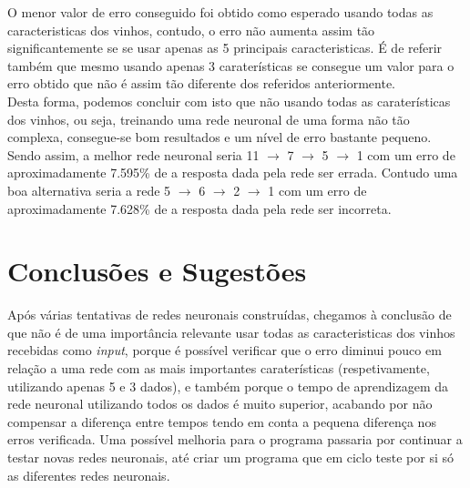 \documentclass{article}
\begin{document}
O menor valor de erro conseguido foi obtido como esperado usando todas as caracteristicas dos vinhos, contudo, o erro não aumenta assim tão significantemente se se usar apenas as 5 principais caracteristicas. É de referir também que mesmo usando apenas 3 caraterísticas se consegue um valor para o erro obtido que não é assim tão diferente dos referidos anteriormente.\\
Desta forma, podemos concluir com isto que não usando todas as caraterísticas dos vinhos, ou seja, treinando uma rede neuronal de uma forma não tão complexa, consegue-se bom resultados e um nível de erro bastante pequeno.
Sendo assim, a melhor rede neuronal seria 11 $\to$ 7 $\to$ 5 $\to$ 1 com um erro de aproximadamente 7.595\% de a resposta dada pela rede ser errada. Contudo uma boa alternativa seria a rede 5 $\to$ 6 $\to$ 2 $\to$ 1 com um erro de aproximadamente 7.628\% de a resposta dada pela rede ser incorreta.

\newpage

\vspace*{\fill}
\section{Conclusões e Sugestões}
Após várias tentativas de redes neuronais construídas, chegamos à conclusão de que não é de uma importância relevante usar todas as caracteristicas dos vinhos recebidas como \textit{input}, porque é possível verificar que o erro diminui pouco em relação a uma rede com as mais importantes caraterísticas (respetivamente, utilizando apenas 5 e 3 dados), e também porque o tempo de aprendizagem da rede neuronal utilizando todos os dados é muito superior, acabando por não compensar a diferença entre tempos tendo em conta a pequena diferença nos erros verificada. Uma possível melhoria para o programa passaria por continuar a testar novas redes neuronais, até criar um programa que em ciclo teste por si só as diferentes redes neuronais.
\vspace*{\fill}
\end{document}
